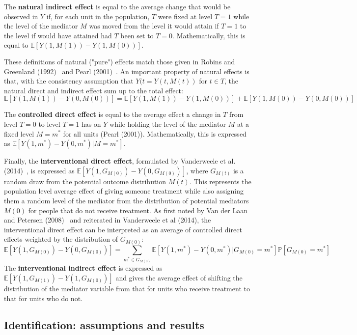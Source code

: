 \documentclass[12pt]{article} %
\numberwithin{equation}{section} %
\begin{document}
The \textbf{natural indirect effect} is equal to the average change that would be observed in $Y$ if, for each unit in the population, $T$ were fixed at level $T = 1$ while the level of the mediator $M$ was moved from the level it would attain if $T=1$ to the level if would have attained had $T$ been set to $T = 0$. Mathematically, this is equal to $\mathbb{E}[Y(1,M(1)) - Y(1,M(0))]$. 

These definitions of natural ("pure") effects match those given in Robins and Greenland (1992)~\citep{robinsgreenland1992} and Pearl (2001)~\citep{pearl2001}. An important property of natural effects is that, with the consistency assumption that $Y(t = Y(t,M(t))$ for $t \in T$, the natural direct and indirect effect sum up to the total effect: $$\mathbb{E}[Y(1,M(1)) - Y(0,M(0))] = \mathbb{E}[Y(1,M(1)) - Y(1,M(0))] + \mathbb{E}[Y(1,M(0)) - Y(0,M(0))]$$

The \textbf{controlled direct effect} is equal to the average effect a change in $T$ from level $T = 0$ to level $T = 1$ has on $Y$ while holding the level of the mediator $M$ at a fixed level $M = m^{*}$ for all units (Pearl (2001)). Mathematically, this is expressed as $\mathbb{E}[Y(1,m^{*}) - Y(0,m^{*}) |M=m^{*}]$.

Finally, the \textbf{interventional direct effect}, formulated by Vanderweele et al. (2014)~\citep{vanderweeleetal2014}, is expressed as $\mathbb{E}[Y(1,G_{M(0)}) - Y(0,G_{M(0)})]$, where $G_{M(t)}$ is a random draw from the potential outcome distribution $M(t)$. This represents the population level average effect of giving someone treatment while also assigning them a random level of the mediator from the distribution of potential mediators $M(0)$ for people that do not receive treatment. As first noted by Van der Laan and Petersen (2008)~\citep{vanderlaanpetersen2008} and reiterated in Vanderweele et al (2014), the interventional direct effect can be interpreted as an average of controlled direct effects weighted by the distribution of $G_{M(0)}$: 
$$\mathbb{E}[Y(1,G_{M(0)}) - Y(0,G_{M(0)})] = \sum_{m^*\in G_{M(0)}} \mathbb{E}[Y(1,m^*) - Y(0,m^*)|G_{M(0)}=m^*]\mathbb{P}[G_{M(0)}=m^*]$$
The \textbf{interventional indirect effect} is expressed as $\mathbb{E}[Y(1,G_{M(1)}) - Y(1,G_{M(0)})]$ and gives the average effect of shifting the distribution of the mediator variable from that for units who receive treatment to that for units who do not. 

\subsection{Identification: assumptions and results}
\end{document}
